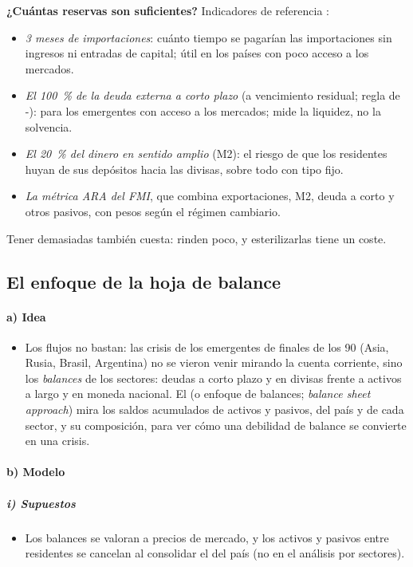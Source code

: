 \documentclass[11pt]{article}
\begin{document}
\begin{anotaciones}
\textbf{¿Cuántas reservas son suficientes?} Indicadores de referencia\nocite{FMI2011Reservas} :
\begin{itemize}
\item \emph{3 meses de importaciones}: cuánto tiempo se pagarían las importaciones sin ingresos ni entradas de capital; útil en los países con poco acceso a los mercados.
\item \emph{El 100~\% de la deuda externa a corto plazo} (a vencimiento residual; regla de -): para los emergentes con acceso a los mercados; mide la liquidez, no la solvencia.
\item \emph{El 20~\% del dinero en sentido amplio} (M2): el riesgo de que los residentes huyan de sus depósitos hacia las divisas, sobre todo con tipo fijo.
\item \emph{La métrica ARA del FMI}, que combina exportaciones, M2, deuda a corto y otros pasivos, con pesos según el régimen cambiario.
\end{itemize}
Tener demasiadas también cuesta: rinden poco, y esterilizarlas tiene un coste.
\end{anotaciones}

\subsection{El enfoque de la hoja de balance}\label{sec:hoja-balance}

\paragraph{a) Idea}
\begin{itemize}
\item Los flujos no bastan: las crisis de los emergentes de finales de los 90 (Asia, Rusia, Brasil, Argentina) no se vieron venir mirando la cuenta corriente, sino los \emph{balances} de los sectores: deudas a corto plazo y en divisas frente a activos a largo y en moneda nacional. El  (o enfoque de balances; \emph{balance sheet approach}) mira los saldos acumulados de activos y pasivos, del país y de cada sector, y su composición, para ver cómo una debilidad de balance se convierte en una crisis\nocite{Allen2002Balances}.
\end{itemize}

\paragraph{b) Modelo}
\subparagraph{i) Supuestos}
\begin{itemize}
\item Los balances se valoran a precios de mercado, y los activos y pasivos entre residentes se cancelan al consolidar el del país (no en el análisis por sectores).
\end{itemize}
\end{document}
